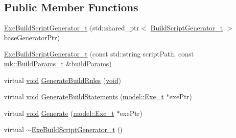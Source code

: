 \subsection*{Public Member Functions}
\begin{DoxyCompactItemize}
\item 
\hyperlink{classninja_1_1_exe_build_script_generator__t_a6ac7d7cef46f9641474d400d84cf8e78}{Exe\+Build\+Script\+Generator\+\_\+t} (std\+::shared\+\_\+ptr$<$ \hyperlink{classninja_1_1_build_script_generator__t}{Build\+Script\+Generator\+\_\+t} $>$ \hyperlink{structninja_1_1_require_base_generator__t_a3a16080268acf0b71c18eed619429f6a}{base\+Generator\+Ptr})
\item 
\hyperlink{classninja_1_1_exe_build_script_generator__t_a35c40837bf249acf20682f834d40f407}{Exe\+Build\+Script\+Generator\+\_\+t} (const std\+::string script\+Path, const \hyperlink{structmk_1_1_build_params__t}{mk\+::\+Build\+Params\+\_\+t} \&\hyperlink{structninja_1_1_require_base_generator__t_a78d7cecd653f49f8ad74fdbb65343705}{build\+Params})
\item 
virtual \hyperlink{_t_e_m_p_l_a_t_e__cdef_8h_ac9c84fa68bbad002983e35ce3663c686}{void} \hyperlink{classninja_1_1_exe_build_script_generator__t_a05c7078ac12351a3651f7edc06372028}{Generate\+Build\+Rules} (\hyperlink{_t_e_m_p_l_a_t_e__cdef_8h_ac9c84fa68bbad002983e35ce3663c686}{void})
\item 
virtual \hyperlink{_t_e_m_p_l_a_t_e__cdef_8h_ac9c84fa68bbad002983e35ce3663c686}{void} \hyperlink{classninja_1_1_exe_build_script_generator__t_aaea7340e985bdbe597bc43adfee18d4e}{Generate\+Build\+Statements} (\hyperlink{structmodel_1_1_exe__t}{model\+::\+Exe\+\_\+t} $\ast$exe\+Ptr)
\item 
virtual \hyperlink{_t_e_m_p_l_a_t_e__cdef_8h_ac9c84fa68bbad002983e35ce3663c686}{void} \hyperlink{classninja_1_1_exe_build_script_generator__t_ae6343ae5342b43ba4d35054532746429}{Generate} (\hyperlink{structmodel_1_1_exe__t}{model\+::\+Exe\+\_\+t} $\ast$exe\+Ptr)
\item 
virtual \hyperlink{classninja_1_1_exe_build_script_generator__t_ab79236c65978fed6612f0cc2d90135f5}{$\sim$\+Exe\+Build\+Script\+Generator\+\_\+t} ()
\end{DoxyCompactItemize}
